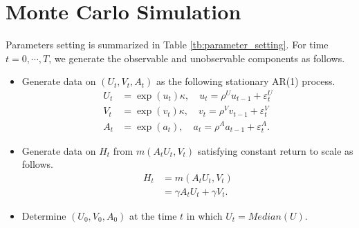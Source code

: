 \documentclass[12pt]{article}
\begin{document}
\section{Monte Carlo Simulation}
Parameters setting is summarized in Table \ref{tb:parameter_setting}.
For time $t=0,\cdots, T$, we generate the observable and unobservable components as follows.
\begin{itemize}
    \item Generate data on $(U_t,V_t,A_t)$ as the following stationary AR(1) process.
    \begin{align*}
        U_t &= \exp(u_t)\kappa,\quad u_t= \rho^{U} u_{t-1} + \varepsilon_{t}^{U}\\
        V_t &= \exp(v_t)\kappa,\quad v_t= \rho^{V} v_{t-1} + \varepsilon_{t}^{V} \\
        A_t &= \exp(a_t),\quad a_{t}=\rho^{A} a_{t-1} + \varepsilon_{t}^{A}.
    \end{align*}
    \item Generate data on $H_t$ from  $m(A_t U_t,V_t)$ satisfying constant return to scale as follows.
    \begin{align*}
        H_t&= m(A_t U_t,V_t)\\
        &=\gamma A_t U_t + \gamma V_t .
    \end{align*}
    \item Determine $(U_0,V_0,A_0)$ at the time $t$ in which $U_t=Median(U)$. 
\end{itemize}
\end{document}
